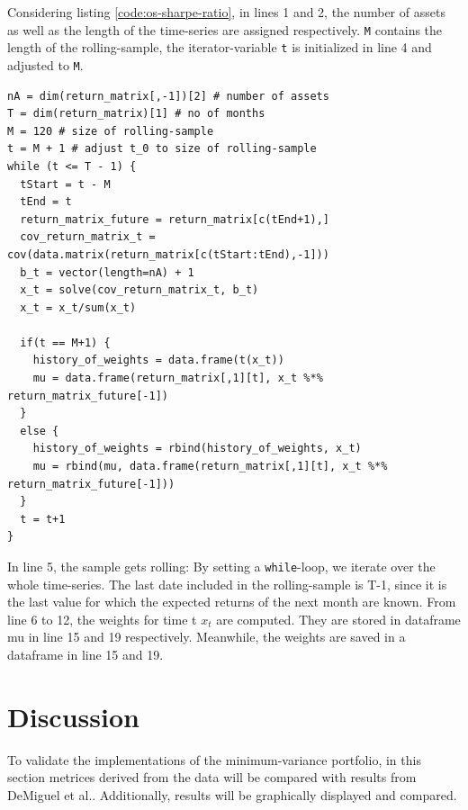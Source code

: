 Considering listing \ref{code:os-sharpe-ratio}, in lines 1 and 2, the number of assets as well as the length of the time-series are assigned respectively. \lstinline|M| contains the length of the rolling-sample, the iterator-variable \lstinline|t| is initialized in line 4 and adjusted to \lstinline|M|.\\

\begin{lstlisting}[caption={Computing the out-sample Sharpe ratio from the matrix of expected returns in R.}, label=code:os-sharpe-ratio, frame=single]
nA = dim(return_matrix[,-1])[2] # number of assets
T = dim(return_matrix)[1] # no of months
M = 120 # size of rolling-sample
t = M + 1 # adjust t_0 to size of rolling-sample
while (t <= T - 1) {
  tStart = t - M 
  tEnd = t 
  return_matrix_future = return_matrix[c(tEnd+1),] 
  cov_return_matrix_t = cov(data.matrix(return_matrix[c(tStart:tEnd),-1])) 
  b_t = vector(length=nA) + 1 
  x_t = solve(cov_return_matrix_t, b_t) 
  x_t = x_t/sum(x_t)
  
  if(t == M+1) { 
    history_of_weights = data.frame(t(x_t))
    mu = data.frame(return_matrix[,1][t], x_t %*% return_matrix_future[-1])
  }
  else {
    history_of_weights = rbind(history_of_weights, x_t)
    mu = rbind(mu, data.frame(return_matrix[,1][t], x_t %*% return_matrix_future[-1]))
  }
  t = t+1
}
\end{lstlisting}

In line 5, the sample gets rolling: By setting a \lstinline|while|-loop, we iterate over the whole time-series. The last date included in the rolling-sample is T-1, since it is the last value for which the expected returns of the next month are known. From line 6 to 12, the weights for time t $x_t$ are computed. They are stored in dataframe mu in line 15 and 19 respectively. Meanwhile, the weights are saved in a dataframe in line 15 and 19.

\newpage

\section{Discussion}
To validate the implementations of the minimum-variance portfolio, in this section metrices derived from the data will be compared with results from DeMiguel et al.\cite{DEM09}. Additionally, results will be graphically displayed and compared.\\


